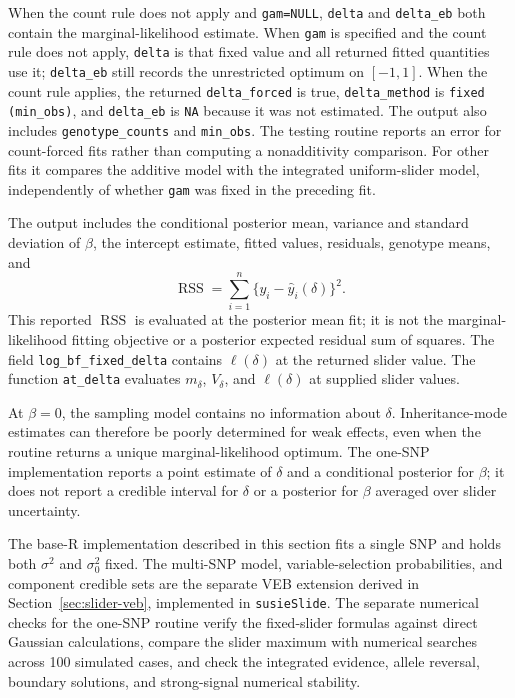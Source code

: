 \documentclass[11pt]{article}
\DeclareMathOperator{\RSS}{RSS}
\begin{document}
When the count rule does not apply and \texttt{gam=NULL},
\texttt{delta} and \texttt{delta\_eb} both
contain the marginal-likelihood estimate. When \texttt{gam} is
specified and the count rule does not apply, \texttt{delta} is that
fixed value and all returned fitted quantities use it;
\texttt{delta\_eb} still records the unrestricted optimum on $[-1,1]$.
When the count rule applies, the returned \texttt{delta\_forced} is true,
\texttt{delta\_method} is \texttt{fixed (min\_obs)}, and
\texttt{delta\_eb} is \texttt{NA} because it was not estimated.
The output also includes \texttt{genotype\_counts} and
\texttt{min\_obs}. The testing routine reports an error for
count-forced fits rather than computing a nonadditivity comparison.
For other fits it compares the additive model with the integrated
uniform-slider model, independently of whether \texttt{gam} was
fixed in the preceding fit.

The output includes the conditional posterior mean, variance and
standard deviation of $\beta$, the intercept estimate, fitted values,
residuals, genotype means, and
\begin{equation}
\RSS=\sum_{i=1}^n\{y_i-\widehat y_i(\delta)\}^2.
\end{equation}
This reported $\RSS$ is evaluated at the posterior mean fit; it is
not the marginal-likelihood fitting objective or a posterior expected
residual sum of squares. The field
\texttt{log\_bf\_fixed\_delta} contains $\ell(\delta)$ at the
returned slider value. The function \texttt{at\_delta} evaluates
$m_\delta$, $V_\delta$, and $\ell(\delta)$ at supplied slider values.

At $\beta=0$, the sampling model contains no information about
$\delta$. Inheritance-mode estimates can therefore be poorly
determined for weak effects, even when the routine returns a unique
marginal-likelihood optimum. The one-SNP implementation reports a
point estimate of $\delta$ and a conditional posterior for $\beta$;
it does not report a credible interval for $\delta$ or a posterior
for $\beta$ averaged over slider uncertainty.

The base-R implementation described in this section fits a single
SNP and holds both $\sigma^2$ and $\sigma_0^2$ fixed. The multi-SNP
model, variable-selection probabilities, and component credible sets
are the separate VEB extension derived in
Section~\ref{sec:slider-veb}, implemented in \texttt{susieSlide}.
The separate numerical checks for the one-SNP routine verify the
fixed-slider formulas against direct Gaussian calculations, compare
the slider maximum with numerical searches across 100 simulated
cases, and check the integrated evidence, allele reversal, boundary
solutions, and strong-signal numerical stability.
\end{document}
